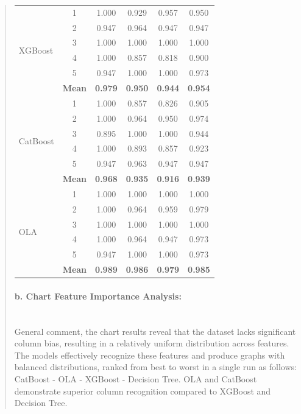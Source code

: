 \documentclass[runningheads]{llncs}
\begin{document}
\begin{abstract}
\begin{table}[H]
\begin{tabular}{|l|c|c|c|c|c|}
\multirow{6}{*}{XGBoost}
& 1 & 1.000 & 0.929 & 0.957 & 0.950 \\
& 2 & 0.947 & 0.964 & 0.947 & 0.947 \\
& 3 & 1.000 & 1.000 & 1.000 & 1.000 \\
& 4 & 1.000 & 0.857 & 0.818 & 0.900 \\
& 5 & 0.947 & 1.000 & 1.000 & 0.973 \\
& \textbf{Mean} & \textbf{0.979} & \textbf{0.950} & \textbf{0.944} & \textbf{0.954} \\
\hline

\multirow{6}{*}{CatBoost}
& 1 & 1.000 & 0.857 & 0.826 & 0.905 \\
& 2 & 1.000 & 0.964 & 0.950 & 0.974 \\
& 3 & 0.895 & 1.000 & 1.000 & 0.944 \\
& 4 & 1.000 & 0.893 & 0.857 & 0.923 \\
& 5 & 0.947 & 0.963 & 0.947 & 0.947 \\
& \textbf{Mean} & \textbf{0.968} & \textbf{0.935} & \textbf{0.916} & \textbf{0.939} \\
\hline

\multirow{6}{*}{OLA}
& 1 & 1.000 & 1.000 & 1.000 & 1.000 \\
& 2 & 1.000 & 0.964 & 0.959 & 0.979 \\
& 3 & 1.000 & 1.000 & 1.000 & 1.000 \\
& 4 & 1.000 & 0.964 & 0.947 & 0.973 \\
& 5 & 0.947 & 1.000 & 1.000 & 0.973 \\
& \textbf{Mean} & \textbf{0.989} & \textbf{0.986} & \textbf{0.979} & \textbf{0.985} \\
\hline
\end{tabular}
\end{table}

\paragraph{\textbf{b. Chart Feature Importance Analysis:}}\\
General comment, the chart results reveal that the dataset lacks significant column bias, resulting in a relatively uniform distribution across features. The models effectively recognize these features and produce graphs with balanced distributions, ranked from best to worst in a single run as follows: CatBoost - OLA - XGBoost - Decision Tree. OLA and CatBoost demonstrate superior column recognition compared to XGBoost and Decision Tree.


\end{abstract}
\end{document}

